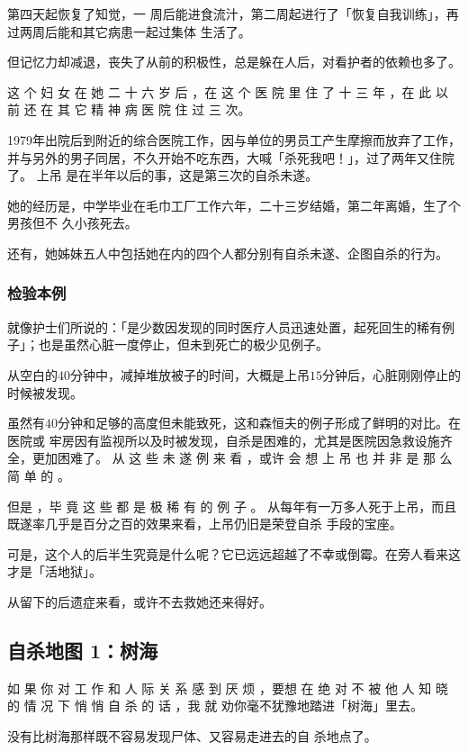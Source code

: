 \documentclass[UTF8]{ctexart}
\begin{document}
第四天起恢复了知觉，一 周后能进食流汁，第二周起进行了「恢复自我训练」，再过两周后能和其它病患一起过集体 生活了。

但记忆力却减退，丧失了从前的积极性，总是躲在人后，对看护者的依赖也多了。

这 个 妇 女 在 她 二 十 六 岁 后 ，在 这 个 医 院 里 住 了 十 三 年 ，在 此 以 前 还 在 其 它 精 神 病 医 院 住 过 三 次。

1979年出院后到附近的综合医院工作，因与单位的男员工产生摩擦而放弃了工作， 并与另外的男子同居，不久开始不吃东西，大喊「杀死我吧！」，过了两年又住院了。
上吊 是在半年以后的事，这是第三次的自杀未遂。

她的经历是，中学毕业在毛巾工厂工作六年，二十三岁结婚，第二年离婚，生了个男孩但不 久小孩死去。

还有，她姊妹五人中包括她在内的四个人都分别有自杀未遂、企图自杀的行为。

\subsubsection*{检验本例}

就像护士们所说的：「是少数因发现的同时医疗人员迅速处置，起死回生的稀有例子」；也是虽然心脏一度停止，但未到死亡的极少见例子。

从空白的$40$分钟中，减掉堆放被子的时间，大概是上吊$15$分钟后，心脏刚刚停止的时候被发现。

虽然有$40$分钟和足够的高度但未能致死，这和森恒夫的例子形成了鲜明的对比。在医院或 牢房因有监视所以及时被发现，自杀是困难的，尤其是医院因急救设施齐全，更加困难了。 从 这 些 未 遂 例 来 看 ，或许 会 想 上 吊 也 并 非 是 那 么 简 单 的 。

但是 ，毕 竟 这 些 都 是 极 稀 有 的 例 子 。 从每年有一万多人死于上吊，而且既遂率几乎是百分之百的效果来看，上吊仍旧是荣登自杀 手段的宝座。

可是，这个人的后半生究竟是什么呢？它已远远超越了不幸或倒霉。在旁人看来这才是「活地狱」。

从留下的后遗症来看，或许不去救她还来得好。

\subsection{自杀地图 1：树海}

如 果 你 对 工 作 和 人 际 关 系 感 到 厌 烦 ，要想 在 绝 对 不 被 他 人 知 晓 的 情 况 下 悄 悄 自 杀 的 话 ，我 就 劝你毫不犹豫地踏进「树海」里去。

没有比树海那样既不容易发现尸体、又容易走进去的自 杀地点了。 
\end{document}

